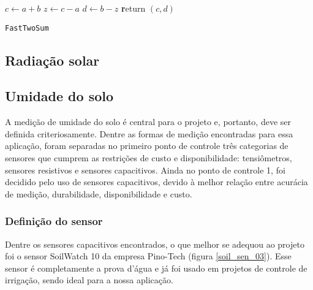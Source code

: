 		\begin{center}
			\begin{minipage}{0.5\linewidth} %
				\begin{algorithm}[H]
					\label{alg_ele_victor_01}
					\medskip
					$c \leftarrow a + b$ \;
					$z \leftarrow c - a$ \;
					$d \leftarrow b - z$ \;
					{\textbf return} $(c,d)$ \;
					\caption{\texttt{FastTwoSum}} %
					\label{alg:fastTwoSum}   %
				\end{algorithm}
			\end{minipage}
		\end{center}

	\subsection{Radiação solar}

		   

	\subsection{Umidade do solo}
		 
	A medição de umidade do solo é central para o projeto e, portanto, deve ser definida criteriosamente. Dentre as formas de medição encontradas para essa aplicação, foram separadas no primeiro ponto de controle três categorias de sensores que cumprem as restrições de custo e disponibilidade: tensiômetros, sensores resistivos e sensores capacitivos. Ainda no ponto de controle 1, foi decidido pelo uso de sensores capacitivos, devido à melhor relação entre acurácia de medição, durabilidade, disponibilidade e custo.
	
		\subsubsection{Definição do sensor}
		
		Dentre os sensores capacitivos encontrados, o que melhor se adequou ao projeto foi o sensor SoilWatch 10 da empresa Pino-Tech (figura \ref{soil_sen_03}). Esse sensor é completamente a prova d'água e já foi usado em projetos de controle de irrigação, sendo ideal para a nossa aplicação.

